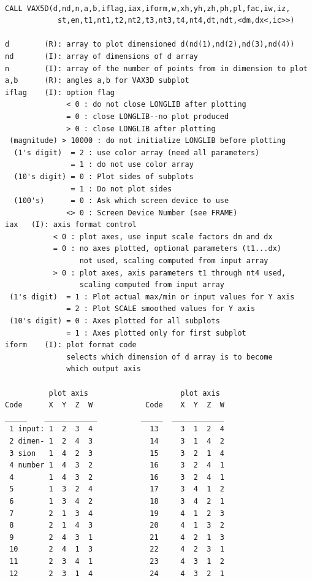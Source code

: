 \documentclass[11pt]{report}
\begin{document}
\begin{verbatim}

CALL VAX5D(d,nd,n,a,b,iflag,iax,iform,w,xh,yh,zh,ph,pl,fac,iw,iz,
            st,en,t1,nt1,t2,nt2,t3,nt3,t4,nt4,dt,ndt,<dm,dx<,ic>>)

d        (R): array to plot dimensioned d(nd(1),nd(2),nd(3),nd(4))
nd       (I): array of dimensions of d array
n        (I): array of the number of points from in dimension to plot
a,b      (R): angles a,b for VAX3D subplot
iflag    (I): option flag
              < 0 : do not close LONGLIB after plotting
              = 0 : close LONGLIB--no plot produced
              > 0 : close LONGLIB after plotting
 (magnitude) > 10000 : do not initialize LONGLIB before plotting
  (1's digit)  = 2 : use color array (need all parameters)
               = 1 : do not use color array
  (10's digit) = 0 : Plot sides of subplots
               = 1 : Do not plot sides
  (100's)      = 0 : Ask which screen device to use
              <> 0 : Screen Device Number (see FRAME)
iax   (I): axis format control
           < 0 : plot axes, use input scale factors dm and dx
           = 0 : no axes plotted, optional parameters (t1...dx)
                 not used, scaling computed from input array
           > 0 : plot axes, axis parameters t1 through nt4 used,
                 scaling computed from input array
 (1's digit)  = 1 : Plot actual max/min or input values for Y axis
              = 2 : Plot SCALE smoothed values for Y axis
 (10's digit) = 0 : Axes plotted for all subplots
              = 1 : Axes plotted only for first subplot
iform    (I): plot format code 
              selects which dimension of d array is to become
              which output axis 

          plot axis                     plot axis
Code      X  Y  Z  W            Code    X  Y  Z  W
_____    ____________          _____  ____________
 1 input: 1  2  3  4             13     3  1  2  4
 2 dimen- 1  2  4  3             14     3  1  4  2
 3 sion   1  4  2  3             15     3  2  1  4
 4 number 1  4  3  2             16     3  2  4  1
 4        1  4  3  2             16     3  2  4  1
 5        1  3  2  4             17     3  4  1  2
 6        1  3  4  2             18     3  4  2  1
 7        2  1  3  4             19     4  1  2  3
 8        2  1  4  3             20     4  1  3  2
 9        2  4  3  1             21     4  2  1  3
 10       2  4  1  3             22     4  2  3  1
 11       2  3  4  1             23     4  3  1  2
 12       2  3  1  4             24     4  3  2  1


\end{verbatim}
\end{document}
